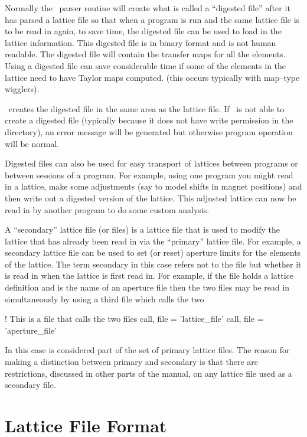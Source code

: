 Normally the \bmad\ parser routine will create what is called a
``digested file'' after it has parsed a lattice file so that when a
program is run and the same lattice file is to be read in again, to save
time, the digested file can be used to load in the lattice information.
This digested file is in binary format and is not human readable. The
digested file will contain the transfer maps for all the elements. 
Using a digested file can save considerable time if some of the
elements in the lattice need to have Taylor maps computed.
(this occurs typically with map--type wigglers).

\bmad\ creates the digested file in the same area as the lattice file.
If \bmad\ is not able to create a digested file (typically because it
does not have write permission in the directory), an error message will
be generated but otherwise program operation will be normal.

Digested files can also be used for easy transport of lattices between
programs or between sessions of a program. For example, using one
program you might read in a lattice, make some adjustments (say to model
shifts in magnet positions) and then write out a digested version of the
lattice. This adjusted lattice can now be read in by another program to
do some custom analysis.

A ``secondary'' lattice file (or files) is a lattice file that is used to modify
the lattice that has already been read in via the ``primary'' lattice
file.  For example, a secondary lattice file can be used to set (or
reset) aperture limits for the elements of the lattice.  The term
secondary in this case refers not to the file but whether it is read
in when the lattice is first read in. For example, if the file
 holds a lattice definition and  is
the name of an aperture file then the two files may be read in simultaneously
by using a third file which calls the two
\begin{example}
  ! This is a file that calls the two files
  call, file = 'lattice_file'
  call, file = 'aperture_file'
\end{example}
In this case  is considered part of the set of
primary lattice files.  The reason for making a distinction between
primary and secondary is that there are restrictions, discussed in
other parts of the manual, on any lattice file used as a secondary
file.


\section{Lattice File Format}

